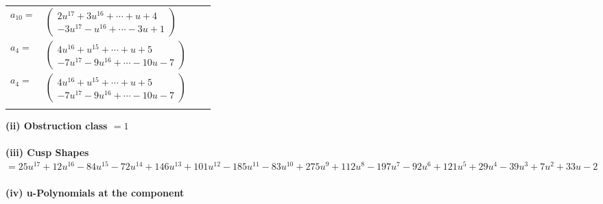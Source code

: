 \documentclass[1p]{elsarticle_modified}
\theoremstyle{definition}
\begin{document}
\begin{tabular}{m{7pt} m{180pt} m{7pt} m{180pt} }
\flushright $a_{10}=$&$\begin{pmatrix}2 u^{17}+3 u^{16}+\cdots+u+4\\-3 u^{17}- u^{16}+\cdots-3 u+1\end{pmatrix}$ \\
\flushright $a_{4}=$&$\begin{pmatrix}4 u^{16}+u^{15}+\cdots+u+5\\-7 u^{17}-9 u^{16}+\cdots-10 u-7\end{pmatrix}$\\ \flushright $a_{4}=$&$\begin{pmatrix}4 u^{16}+u^{15}+\cdots+u+5\\-7 u^{17}-9 u^{16}+\cdots-10 u-7\end{pmatrix}$\\&\end{tabular}
\flushleft \textbf{(ii) Obstruction class $= 1$}\\~\\
\flushleft \textbf{(iii) Cusp Shapes $= 25 u^{17}+12 u^{16}-84 u^{15}-72 u^{14}+146 u^{13}+101 u^{12}-185 u^{11}-83 u^{10}+275 u^9+112 u^8-197 u^7-92 u^6+121 u^5+29 u^4-39 u^3+7 u^2+33 u-2$}\\~\\
\newpage\renewcommand{\arraystretch}{1}
\flushleft \textbf{(iv) u-Polynomials at the component}\newline \\
\end{document}
